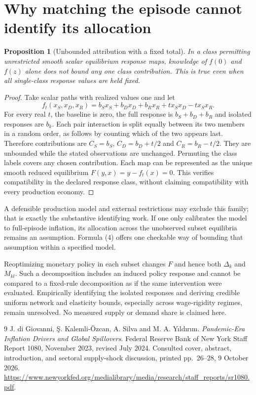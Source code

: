 \documentclass[11pt]{article}
\newtheorem{proposition}[theorem]{Proposition}
\theoremstyle{remark}
\begin{document}
\section{Why matching the episode cannot identify its allocation}
\begin{proposition}[Unbounded attribution with a fixed total]
In a class permitting unrestricted smooth scalar equilibrium response
maps, knowledge of $f(0)$ and $f(z)$ alone does not bound any one class
contribution. This is true even when all single-class response values
are held fixed.
\end{proposition}
\begin{proof}
Take scalar paths with realized values one and let
\[
 f_t(x_S,x_D,x_R)=b_Sx_S+b_Dx_D+b_Rx_R
                  +t x_Sx_D-t x_Sx_R.
\]
For every real $t$, the baseline is zero, the full response is
$b_S+b_D+b_R$ and isolated responses are $b_k$. Each pair interaction
is split equally between its two members in a random order, as follows
by counting which of the two appears last. Therefore contributions are
$C_S=b_S$, $C_D=b_D+t/2$ and $C_R=b_R-t/2$.
They are unbounded while the stated observations are unchanged.
Permuting the class labels covers any chosen contribution.
Each map can be represented as the unique smooth reduced equilibrium
$F(y,x)=y-f_t(x)=0$. This verifies compatibility in the declared response
class, without claiming compatibility with every production economy.
\end{proof}
A defensible production model and external restrictions may exclude this
family; that is exactly the substantive identifying work. If one only
calibrates the model to full-episode inflation, its allocation across the
unobserved subset equilibria remains an assumption. Formula (4) offers
one checkable way of bounding that assumption within a specified model.

Reoptimizing monetary policy in each subset changes $F$ and hence both
$\Delta_k$ and $M_{kl}$. Such a decomposition includes an induced policy
response and cannot be compared to a fixed-rule decomposition as if the
same intervention were evaluated. Empirically identifying the isolated
responses and deriving credible uniform network and elasticity bounds,
especially across wage-rigidity regimes, remain unresolved. No measured
supply or demand share is claimed here.

\begin{thebibliography}{9}
 J. di Giovanni, \c{S}. Kalemli-\"Ozcan, A. Silva and
M. A. Y\i ld\i r\i m. \emph{Pandemic-Era Inflation Drivers and Global
Spillovers}. Federal Reserve Bank of New York Staff Report 1080,
November 2023, revised July 2024. Consulted cover, abstract, introduction,
and sectoral supply-shock discussion, printed pp.~26--28, 9 October 2026.
\url{https://www.newyorkfed.org/medialibrary/media/research/staff_reports/sr1080.pdf}.
\end{thebibliography}
\end{document}
